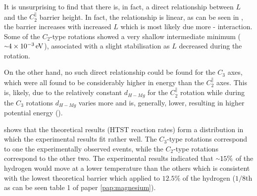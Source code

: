 It is unsurprising to find that there is, in fact, a direct relationship between $L$ and the $C_2^\parallel$ barrier height.
In fact, the relationship is linear, as can be seen in , the barrier increases with increased $L$ which is most likely due more - interaction.
Some of the $C_2$-type rotations showed a very shallow intermediate minimum ($\mytilde 4\times10^{-3} \unit{eV}$), associated with a slight stabilisation as $L$ decreased during the rotation.

On the other hand, no such direct relationship could be found for the $C_3$ axes, which were all found to be considerably higher in energy than the $C_2^\parallel$ axes.
This is, likely, due to the relatively constant $d_{H-Mg}$ for the $C_2^\parallel$ rotation while during the $C_3$ rotations $d_{H-Mg}$ varies more and is, generally, lower, resulting in higher potential energy ().

 shows that the theoretical results (HTST reaction rates) form a distribution in which the experimental results fit rather well.
The $C_3$-type rotations correspond to one the experimentally observed events, while the $C_2$-type rotations correspond to the other two.
The experimental results indicated that $\mytilde 15\%$ of the hydrogen would move at a lower temperature than the others which is consistent with the lowest theoretical barrier which applied to $12.5\%$ of the hydrogen ($1/8$th as can be seen table 1 of paper \ref{pap:magnesium}).
